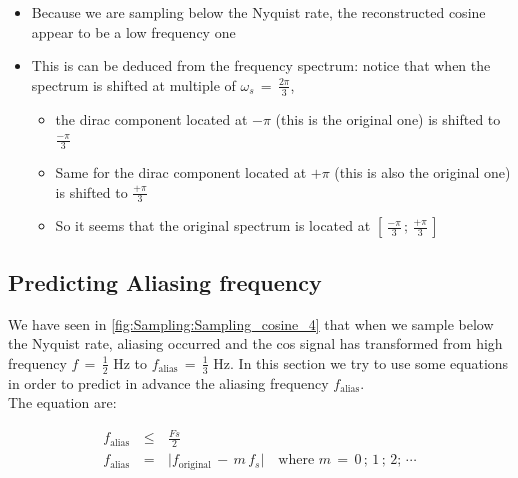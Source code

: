 \begin{itemize}

\item Because we are sampling below the Nyquist rate, the reconstructed cosine appear to be a low frequency one

\item This is can be deduced from the frequency spectrum: notice that when the spectrum is shifted at multiple of $\omega_s \, = \, \displaystyle\frac{2 \pi}{3}$, 

	\begin{itemize}
	
	\item the dirac component located at $-\pi$ (this is the original one) is shifted to $\displaystyle\frac{-\pi}{3}$	
	
		\item Same for the dirac component located at $+\pi$ (this is also the original one) is shifted to $\displaystyle\frac{+\pi}{3}$
		
		\item So it seems that the original spectrum is located at $\left[\, \displaystyle\frac{-\pi}{3} \, ; \, \displaystyle\frac{+\pi}{3} \, \right]$
	
	\end{itemize}

\end{itemize}


\subsection{Predicting Aliasing frequency}

We have seen in \autoref{fig:Sampling:Sampling_cosine_4} that when we sample below the Nyquist rate, aliasing occurred and the cos signal has transformed from high frequency $f \, = \, \displaystyle\frac{1}{2}$ Hz to $f_{\text{alias}} \, = \, \displaystyle\frac{1}{3}$ Hz. In this section we try to use some equations in order to predict in advance the aliasing frequency $f_{\text{alias}}$.\\

The equation are:

\begin{equation}
\begin{array}{rcl}
f_{\text{alias}} \, &\leq& \, \displaystyle\frac{Fs}{2} \\
f_{\text{alias}} \, &=& \, \lvert f_{\text{original}} \, - \, m \, f_s  \rvert \quad \text{where } m \, = \, 0 \, ; \, 1 \, ; \, 2 ;\, \cdots
\end{array}
\label{Eq:Sampling:alias_frequency}
\end{equation} 

